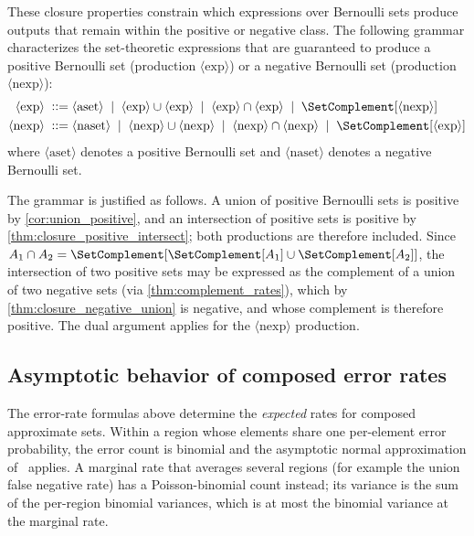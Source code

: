 These closure properties constrain which expressions over Bernoulli sets
produce outputs that remain within the positive or negative class.
The following grammar characterizes the set-theoretic expressions that are
guaranteed to produce a positive Bernoulli set (production $\langle
\mathrm{exp} \rangle$) or a negative Bernoulli set (production $\langle
\mathrm{nexp} \rangle$):
\begin{align}
\label{eq:grammar_exp}
\langle \mathrm{exp} \rangle \; ::= \; &
    \langle \mathrm{aset} \rangle
    \;\mid\; \langle \mathrm{exp} \rangle \cup \langle \mathrm{exp} \rangle
    \;\mid\; \langle \mathrm{exp} \rangle \cap \langle \mathrm{exp} \rangle
    \;\mid\; \SetComplement[\langle \mathrm{nexp} \rangle] \\
\label{eq:grammar_nexp}
\langle \mathrm{nexp} \rangle \; ::= \; &
    \langle \mathrm{naset} \rangle
    \;\mid\; \langle \mathrm{nexp} \rangle \cup \langle \mathrm{nexp}
        \rangle
    \;\mid\; \langle \mathrm{nexp} \rangle \cap \langle \mathrm{nexp}
        \rangle
    \;\mid\; \SetComplement[\langle \mathrm{exp} \rangle]
\end{align}
where $\langle \mathrm{aset} \rangle$ denotes a positive Bernoulli set and
$\langle \mathrm{naset} \rangle$ denotes a negative Bernoulli set.

The grammar is justified as follows.
A union of positive Bernoulli sets is positive by
\cref{cor:union_positive}, and an intersection of positive sets is positive
by \cref{thm:closure_positive_intersect}; both productions are therefore included.
Since $A_1 \cap A_2 = \SetComplement[\SetComplement[A_1] \cup
\SetComplement[A_2]]$, the intersection of two positive sets may be
expressed as the complement of a union of two negative sets (via
\cref{thm:complement_rates}), which by
\cref{thm:closure_negative_union} is negative, and whose complement is
therefore positive.
The dual argument applies for the $\langle \mathrm{nexp} \rangle$
production.

\subsection{Asymptotic behavior of composed error rates}

The error-rate formulas above determine the \emph{expected} rates for composed approximate sets.
Within a region whose elements share one per-element error probability, the error count is binomial and the asymptotic normal approximation of~\cite{bernoulliSets} applies.
A marginal rate that averages several regions (for example the union false negative rate) has a Poisson-binomial count instead; its variance is the sum of the per-region binomial variances, which is at most the binomial variance at the marginal rate.

